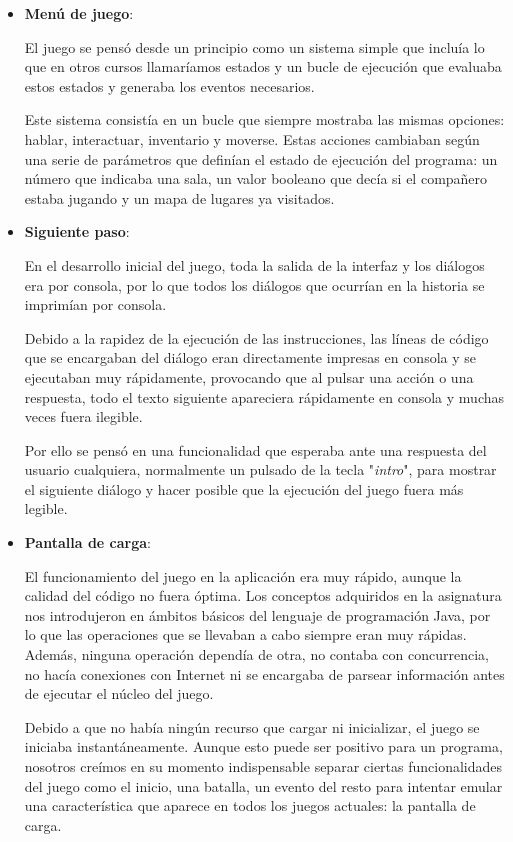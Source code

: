 \documentclass[12pt]{article}
\begin{document}
\begin{itemize}
	\item \textbf{Menú de juego}:
	
	El juego se pensó desde un principio como un sistema simple que incluía lo que en otros cursos llamaríamos estados  y un bucle de ejecución que evaluaba estos estados y generaba los eventos necesarios.
	
	Este sistema consistía en un bucle que siempre mostraba las mismas opciones: hablar, interactuar, inventario y moverse. Estas acciones cambiaban según una serie de parámetros que definían el estado de ejecución del programa: un número que indicaba una sala, un valor booleano que decía si el compañero estaba jugando y un mapa de lugares ya visitados.
	
	\item \textbf{Siguiente paso}:
	
	En el desarrollo inicial del juego, toda la salida de la interfaz y los diálogos era por consola, por lo que todos los diálogos que ocurrían en la historia se imprimían por consola.
	
	Debido a la rapidez de la ejecución de las instrucciones, las líneas de código que se encargaban del diálogo eran directamente impresas en consola y se ejecutaban muy rápidamente, provocando que al pulsar una acción o una respuesta, todo el texto siguiente apareciera rápidamente en consola  y muchas veces fuera ilegible.
	
	Por ello se pensó en una funcionalidad que esperaba ante una respuesta del usuario cualquiera, normalmente un pulsado de la tecla "\textit{intro}", para mostrar el siguiente diálogo y hacer posible que la ejecución del juego fuera más legible.
	
	\item \textbf{Pantalla de carga}:
	
	El funcionamiento del juego en la aplicación era muy rápido, aunque la calidad del código no fuera óptima. Los conceptos adquiridos en la asignatura nos introdujeron en ámbitos básicos del lenguaje de programación Java, por lo que las operaciones que se llevaban a cabo siempre eran muy rápidas. Además, ninguna operación dependía de otra, no contaba con concurrencia, no hacía conexiones con Internet ni se encargaba de parsear  información antes de ejecutar el núcleo del juego.
	
	Debido a que no había ningún recurso que cargar ni inicializar, el juego se iniciaba instantáneamente.
	Aunque esto puede ser positivo para un programa, nosotros creímos en su momento indispensable separar ciertas funcionalidades del juego como el inicio, una batalla, un evento del resto para intentar emular una característica que aparece en todos los juegos actuales: la pantalla de carga.
	

\end{itemize}
\end{document}
